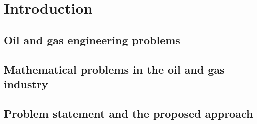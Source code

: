 \chapter{Introduction}

\section{Oil and gas engineering problems}
\section{Mathematical problems in the oil and gas industry}
\section{Problem statement and the proposed approach}
